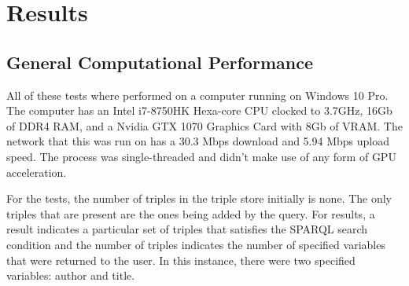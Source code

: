 \documentclass[12pt]{article}
\begin{document}
	\section{Results}
	\subsection{General Computational Performance}
	\quad All of these tests where performed on a computer running on Windows 10 Pro. The computer has an Intel i7-8750HK Hexa-core CPU clocked to 3.7GHz, 16Gb of DDR4 RAM, and a Nvidia GTX 1070 Graphics Card with 8Gb of VRAM. The network that this was run on has a 30.3 Mbps download and 5.94 Mbps upload speed. The process was single-threaded and didn't make use of any form of GPU acceleration. 
	
	For the tests, the number of triples in the triple store initially is none. The only triples that are present are the ones being added by the query. For results, a result indicates a particular set of triples that satisfies the SPARQL search condition and the number of triples indicates the number of specified variables that were returned to the user. In this instance, there were two specified variables: author and title.
	
\end{document}
